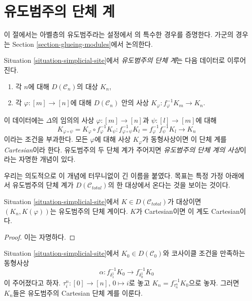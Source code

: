 \section{유도범주의 단체 계}
\label{section-glueing}

\noindent
이 절에서는 아벨층의 유도범주라는 설정에서
\cite[Proposition 3.2.9]{BBD}의 특수한 경우를 증명한다.
가군의 경우는 Section \ref{section-glueing-modules}에서 논의한다.

\begin{definition}
\label{definition-cartesian-derived}
Situation \ref{situation-simplicial-site}에서
{\it 유도범주의 단체 계}는 다음 데이터로 이루어진다.
\begin{enumerate}
\item 각 $n$에 대해 $D(\mathcal{C}_n)$의 대상 $K_n$,
\item 각 $\varphi : [m] \to [n]$에 대해 $D(\mathcal{C}_n)$ 안의 사상
$K_\varphi : f_\varphi^{-1}K_m \to K_n$.
\end{enumerate}
이 데이터에는 $\Delta$의 임의의 사상
$\varphi : [m] \to [n]$과 $\psi : [l] \to [m]$에 대해
$$
K_{\varphi \circ \psi} = K_\varphi \circ f_\varphi^{-1}K_\psi :
f_{\varphi \circ \psi}^{-1}K_l = f_\varphi^{-1} f_\psi^{-1}K_l
\longrightarrow
K_n
$$
이라는 조건을 부과한다.
모든 $\varphi$에 대해 사상 $K_\varphi$가 동형사상이면
이 단체 계를 {\it Cartesian}이라 한다.
유도범주의 두 단체 계가 주어지면
{\it 유도범주의 단체 계의 사상}이라는 자명한 개념이 있다.
\end{definition}

\noindent
우리는 의도적으로 이 개념에 터무니없이 긴 이름을 붙였다.
목표는 특정 가정 아래에서 유도범주의 단체 계가
$D(\mathcal{C}_{total})$의 한 대상에서 온다는 것을 보이는 것이다.

\begin{lemma}
\label{lemma-cartesian-objects-derived}
Situation \ref{situation-simplicial-site}에서
$K \in D(\mathcal{C}_{total})$가 대상이면
$(K_n, K(\varphi))$는 유도범주의 단체 계이다.
$K$가 Cartesian이면 이 계도 Cartesian이다.
\end{lemma}

\begin{proof}
이는 자명하다.
\end{proof}

\begin{lemma}
\label{lemma-construct-cartesian-objects-derived}
Situation \ref{situation-simplicial-site}에서
$K_0 \in D(\mathcal{C}_0)$와 코사이클 조건을 만족하는 동형사상
$$
\alpha :
f_{\delta_1^1}^{-1}K_0
\longrightarrow
f_{\delta_0^1}^{-1}K_0
$$
이 주어졌다고 하자.
$\tau^n_i : [0] \to [n]$, $0 \mapsto i$로 놓고
$K_n = f_{\tau^n_n}^{-1}K_0$으로 놓자.
그러면 $K_n$들은 유도범주의 Cartesian 단체 계를 이룬다.
\end{lemma}

